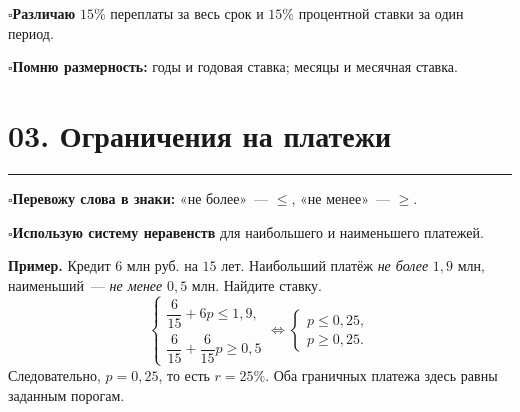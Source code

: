 \documentclass[a4paper,12pt]{article}
\newcommand{\criterion}[1]{\textcolor{darkaccent}{\bfseries #1}}
\newcommand{\checkitem}[1]{\par\noindent\hspace{-1pt}\textcolor{accent}{\(\square\)}\enspace #1\par}
\newcommand{\lessonsection}[1]{\Needspace{5\baselineskip}\section*{\color{darkaccent}#1}\vspace{-5pt}\noindent\textcolor{accent}{\rule{25mm}{0.7pt}}\par\vspace{1pt}}
\begin{document}
\checkitem{\criterion{Различаю} \(15\%\) переплаты за весь срок и \(15\%\) процентной ставки за один период.}
\checkitem{\criterion{Помню размерность:} годы и годовая ставка; месяцы и месячная ставка.}

\lessonsection{03. Ограничения на платежи}
\checkitem{\criterion{Перевожу слова в знаки:} «не более»~--- \(\le\), «не менее»~--- \(\ge\).}
\checkitem{\criterion{Использую систему неравенств} для наибольшего и наименьшего платежей.}

\textbf{Пример.} Кредит \(6\) млн руб. на \(15\) лет. Наибольший платёж \emph{не более} \(1{,}9\) млн, наименьший~--- \emph{не менее} \(0{,}5\) млн. Найдите ставку.
\[
\begin{cases}
\dfrac6{15}+6p\le 1{,}9,\\[5pt]
\dfrac6{15}+\dfrac6{15}p\ge0{,}5
\end{cases}
\iff
\begin{cases}
p\le0{,}25,\\p\ge0{,}25.
\end{cases}
\]
Следовательно, \(p=0{,}25\), то есть \(\boxed{r=25\%}\). Оба граничных платежа здесь равны заданным порогам.
\end{document}
